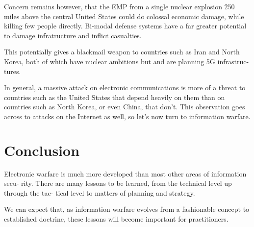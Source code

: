 \documentclass[10pt,journal,compsoc]{IEEEtran}
\begin{document}
Concern remains however, that the EMP from a single nuclear explosion 250 miles
above the central United States could do colossal economic damage, while killing few
people directly. Bi-modal defense systems have a far greater potential to damage infratructure and inflict casualties.


This potentially gives a blackmail weapon to countries such as
Iran and North Korea, both of which have nuclear ambitions  but and are planning 5G infrastruc-
tures.

In general, a massive attack on electronic communications is more of a threat to
countries such as the United States that depend heavily on them than on countries such
as North Korea, or even China, that don’t. This observation goes across to attacks on
the Internet as well, so let’s now turn to information warfare.

\section{Conclusion}

Electronic warfare is much more developed than most other areas of information secu-
rity. There are many lessons to be learned, from the technical level up through the tac-
tical level to matters of planning and strategy.

We can expect that, as information
warfare evolves from a fashionable concept to established doctrine, these lessons will
become important for practitioners.


%
\end{document}
